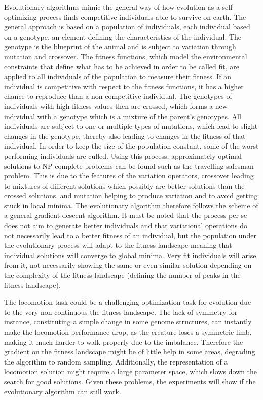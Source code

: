 \documentclass[main]{subfiles}
\begin{document}
Evolutionary algorithms mimic the general way of how evolution as a self-optimizing process finds competitive individuals able to survive on earth. %
%
The general approach is based on a population of individuals, each individual based on a genotype, an element defining the characteristics of the individual. %
%
The genotype is the blueprint of the animal and is subject to variation through mutation and crossover. %
%
The fitness functions, which model the environmental constraints that define what has to be achieved in order to be called fit, are applied to all individuals of the population to measure their fitness. %
%
If an individual is competitive with respect to the fitness functions, it has a higher chance to reproduce than a non-competitive individual. %
%
The genotypes of individuals with high fitness values then are crossed, which forms a new individual with a genotype which is a mixture of the parent's genotypes. %
%
All individuals are subject to one or multiple types of mutations, which lead to slight changes in the genotype, thereby also leading to changes in the fitness of that individual. %
%
In order to keep the size of the population constant, some of the worst performing individuals are culled. Using this process, approximately optimal solutions to NP-complete problems can be found such as the travelling salesman problem. %
%
This is due to the features of the variation operators, crossover leading to mixtures of different solutions which possibly are better solutions than the crossed solutions, and mutation helping to produce variation and to avoid getting stuck in local minima. %
%
The evolutionary algorithm therefore follows the scheme of a general gradient descent algorithm. %
%
It must be noted that the process per se does not aim to generate better individuals and that variational operations do not necessarily lead to a better fitness of an individual, but the population under the evolutionary process will adapt to the fitness landscape meaning that individual solutions will converge to global minima. %
%
Very fit individuals will arise from it, not necessarily showing the same or even similar solution depending on the complexity of the fitness landscape (defining the number of peaks in the fitness landscape). 


The locomotion task could be a challenging optimization task for evolution due to the very non-continuous the fitness landscape. %
%
The lack of symmetry for instance, constituting a simple change in some genome structures, can instantly make the locomotion performance drop, as the creature loses a symmetric limb, making it much harder to walk properly due to the imbalance. %
%
Therefore the gradient on the fitness landscape might be of little help in some areas, degrading the algorithm to random sampling. %
%
Additionally, the representation of a locomotion solution might require a large parameter space, which slows down the search for good solutions. Given these problems, the experiments will show if the evolutionary algorithm can still work.
\end{document}
